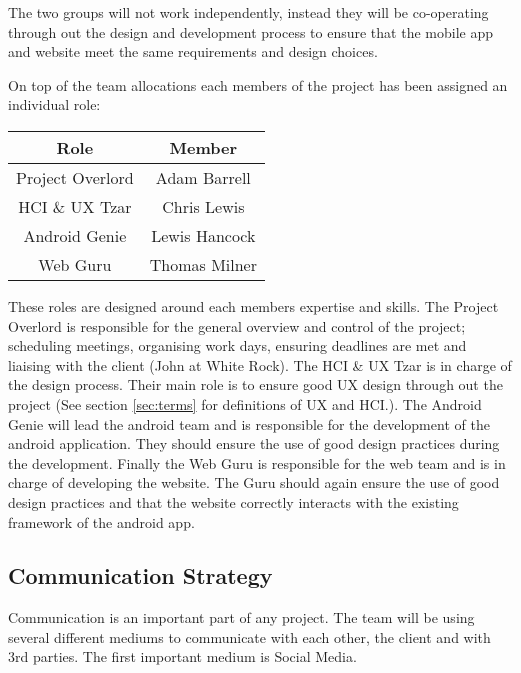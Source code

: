 \documentclass[11pt,a4paper]{article}
\begin{document}
The two groups will not work independently, instead they will be co-operating through out the design and development process to ensure that the mobile app and website meet the same requirements and design choices. 

On top of the team allocations each members of the project has been assigned an individual role:

\begin{table}[h]
\begin{center}
\begin{tabular}{|c|c|}
\hline
\textbf{Role} & \textbf{Member} \\
\hline
Project Overlord & Adam Barrell  \\\hline
HCI \& UX Tzar & Chris Lewis \\ \hline
Android Genie & Lewis Hancock \\\hline
Web Guru & Thomas Milner \\\hline
\end{tabular}
\end{center}
\end{table}%

These roles are designed around each members expertise and skills. The Project Overlord is responsible for the general overview and control of the project; scheduling meetings, organising work days, ensuring deadlines are met and liaising with the client (John at White Rock). The HCI \& UX Tzar is in charge of the design process. Their main role is to ensure good UX design through out the project (See section \ref{sec:terms} for definitions of UX and HCI.). The Android Genie will lead the android team and is responsible for the development of the android application. They should ensure the use of good design practices during the development. Finally the Web Guru is responsible for the web team and is in charge of developing the website. The Guru should again ensure the use of good design practices and that the website correctly interacts with the existing framework of the android app. 

\subsection{Communication Strategy}

Communication is an important part of any project. The team will be using several different mediums to communicate with each other, the client and with 3rd parties. The first important medium is Social Media. 
\end{document}
